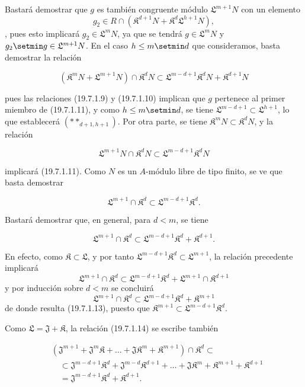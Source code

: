 Bastará demostrar que $g$ es también congruente módulo $\mathfrak L^{m+1}N$ con un elemento \[
  g_2\in R\cap(\mathfrak K^{d+1}N+\mathfrak K^d\mathfrak L^{h+1}N),
\], pues esto implicará $g_2\in\mathfrak L^mN$, ya que se tendrá $g\in\mathfrak L^mN$ y $g_2\setmin g\in\mathfrak L^{m+1}N$. En el caso $h\leq m\setmin d$ que consideramos, basta demostrar la relación
\begin{env}[19.7.1.11]
\label{IV.19.7.1.11}
\[
  (\mathfrak K^mN+\mathfrak L^{m+1}N)\cap\mathfrak K^dN\subset\mathfrak L^{m-d+1}\mathfrak K^dN+\mathfrak K^{d+1}N
\]
\end{env}

pues las relaciones (19.7.1.9) y (19.7.1.10) implican que $g$ pertenece al primer miembro de (19.7.1.11), y como $h\leq m\setmin d$, se tiene $\mathfrak L^{m-d+1}\subset\mathfrak L^{h+1}$, lo que establecerá $(**_{d+1,h+1})$. Por otra parte, se tiene $\mathfrak K^mN\subset\mathfrak K^dN$, y la relación
\begin{env}[19.7.1.12]
\label{IV.19.7.1.12}
\[
  \mathfrak L^{m+1}N\cap\mathfrak K^dN\subset\mathfrak L^{m-d+1}\mathfrak K^dN
\]
\end{env}
implicará (19.7.1.11). Como $N$ es un $A$-módulo libre de tipo finito, se ve que basta demostrar
\begin{env}[19.7.1.13]
\label{IV.19.7.1.13}
\[
  \mathfrak L^{m+1}\cap\mathfrak K^d\subset\mathfrak L^{m-d+1}\mathfrak K^d.
\]
\end{env}

Bastará demostrar que, en general, para $d<m$, se tiene
\begin{env}[19.7.1.14]
\label{IV.19.7.1.14}
\[
  \mathfrak L^{m+1}\cap\mathfrak K^d\subset\mathfrak L^{m-d+1}\mathfrak K^d+\mathfrak K^{d+1}.
\]
\end{env}
En efecto, como $\mathfrak K\subset\mathfrak L$, y por tanto $\mathfrak L^{m-d+1}\mathfrak K^d\subset\mathfrak L^{m+1}$, la relación precedente implicará
\[
  \mathfrak L^{m+1}\cap\mathfrak K^d\subset\mathfrak L^{m-d+1}\mathfrak K^d+\mathfrak L^{m+1}\cap\mathfrak K^{d+1}
\]
y por inducción sobre $d<m$ se concluirá
\[
  \mathfrak L^{m+1}\cap\mathfrak K^d\subset\mathfrak L^{m-d+1}\mathfrak K^d+\mathfrak K^{m+1}
\]
de donde resulta (19.7.1.13), puesto que $\mathfrak K^{m+1}\subset\mathfrak L^{m-d+1}\mathfrak K^d$.

Como $\mathfrak L=\mathfrak J+\mathfrak K$, la relación (19.7.1.14) se escribe también
\begin{env}[19.7.1.15]
\label{IV.19.7.1.15}
\[
\begin{aligned}
  &(\mathfrak J^{m+1}+\mathfrak J^m\mathfrak K+\ldots+\mathfrak J\mathfrak K^m+\mathfrak K^{m+1})\cap\mathfrak K^d\subset\\
  &\quad\subset\mathfrak J^{m-d+1}\mathfrak K^d+\mathfrak J^{m-d}\mathfrak K^{d+1}+\ldots+\mathfrak J\mathfrak K^m+\mathfrak K^{m+1}+\mathfrak K^{d+1}\\
  &\quad=\mathfrak J^{m-d+1}\mathfrak K^d+\mathfrak K^{d+1}.
\end{aligned}
\]
\end{env}

